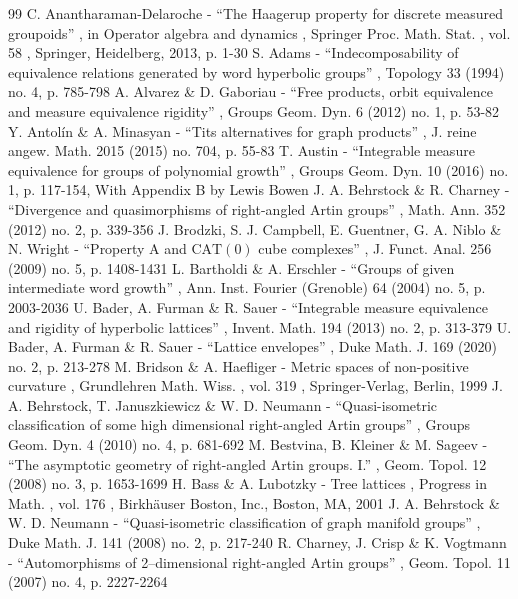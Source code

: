 \documentclass[11pt]{article}
\numberwithin{equation}{section}
\theoremstyle{plain}
\theoremstyle{definition}
\begin{document}
\begin{thebibliography}{99}
 C. Anantharaman-Delaroche - “The Haagerup property for discrete measured groupoids” , in Operator algebra and dynamics , Springer Proc. Math. Stat. , vol. 58 , Springer, Heidelberg, 2013, p. 1-30
 S. Adams - “Indecomposability of equivalence relations generated by word hyperbolic groups” , Topology 33 (1994) no. 4, p. 785-798
 A. Alvarez \& D. Gaboriau - “Free products, orbit equivalence and measure equivalence rigidity” , Groups Geom. Dyn. 6 (2012) no. 1, p. 53-82
 Y. Antolín \& A. Minasyan - “Tits alternatives for graph products” , J. reine angew. Math. 2015 (2015) no. 704, p. 55-83
 T. Austin - “Integrable measure equivalence for groups of polynomial growth” , Groups Geom. Dyn. 10 (2016) no. 1, p. 117-154, With Appendix B by Lewis Bowen
 J. A. Behrstock \& R. Charney - “Divergence and quasimorphisms of right-angled Artin groups” , Math. Ann. 352 (2012) no. 2, p. 339-356
 J. Brodzki, S. J. Campbell, E. Guentner, G. A. Niblo \& N. Wright - “Property A and $\mathrm{CAT}(0)$ cube complexes” , J. Funct. Anal. 256 (2009) no. 5, p. 1408-1431
 L. Bartholdi \& A. Erschler - “Groups of given intermediate word growth” , Ann. Inst. Fourier (Grenoble) 64 (2004) no. 5, p. 2003-2036
 U. Bader, A. Furman \& R. Sauer - “Integrable measure equivalence and rigidity of hyperbolic lattices” , Invent. Math. 194 (2013) no. 2, p. 313-379
 U. Bader, A. Furman \& R. Sauer - “Lattice envelopes” , Duke Math. J. 169 (2020) no. 2, p. 213-278
 M. Bridson \& A. Haefliger - Metric spaces of non-positive curvature , Grundlehren Math. Wiss. , vol. 319 , Springer-Verlag, Berlin, 1999
 J. A. Behrstock, T. Januszkiewicz \& W. D. Neumann - “Quasi-isometric classification of some high dimensional right-angled Artin groups” , Groups Geom. Dyn. 4 (2010) no. 4, p. 681-692
 M. Bestvina, B. Kleiner \& M. Sageev - “The asymptotic geometry of right-angled Artin groups. I.” , Geom. Topol. 12 (2008) no. 3, p. 1653-1699
 H. Bass \& A. Lubotzky - Tree lattices , Progress in Math. , vol. 176 , Birkhäuser Boston, Inc., Boston, MA, 2001
 J. A. Behrstock \& W. D. Neumann - “Quasi-isometric classification of graph manifold groups” , Duke Math. J. 141 (2008) no. 2, p. 217-240
 R. Charney, J. Crisp \& K. Vogtmann - “Automorphisms of 2–dimensional right-angled Artin groups” , Geom. Topol. 11 (2007) no. 4, p. 2227-2264

\end{thebibliography}
\end{document}
